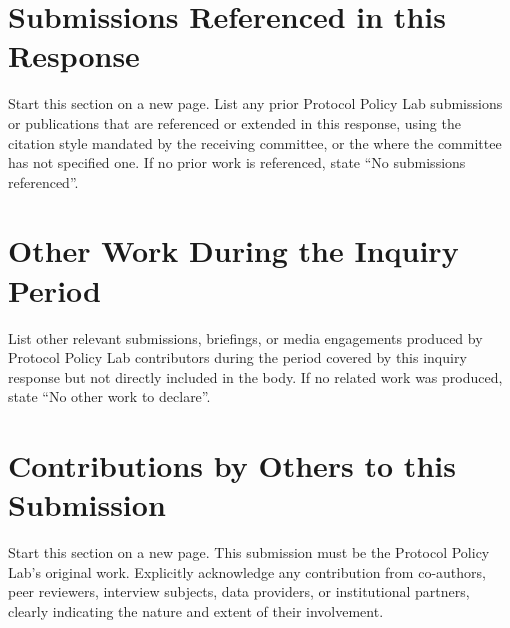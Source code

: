 

\section{Submissions Referenced in this Response}

\begin{instructional}
Start this section on a new page. List any prior Protocol Policy Lab submissions or publications that are referenced or extended in this response, using the citation style mandated by the receiving committee, or the \href{https://www.stylemanual.gov.au/}{\color{blue}{Australian Government Style Manual}} where the committee has not specified one. If no prior work is referenced, state ``No submissions referenced''.
\end{instructional}


\section{Other Work During the Inquiry Period}

\begin{instructional}
List other relevant submissions, briefings, or media engagements produced by Protocol Policy Lab contributors during the period covered by this inquiry response but not directly included in the body. If no related work was produced, state ``No other work to declare''.
\end{instructional}


\clearpage
\section{Contributions by Others to this Submission}

\begin{instructional}
Start this section on a new page. This submission must be the Protocol Policy Lab's original work. Explicitly acknowledge any contribution from co-authors, peer reviewers, interview subjects, data providers, or institutional partners, clearly indicating the nature and extent of their involvement.
\end{instructional}


